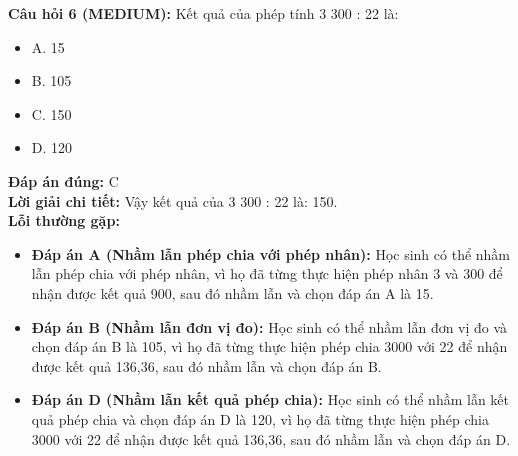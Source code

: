 \documentclass{article}
\begin{document}
\begin{minipage}{\textwidth}
\noindent\textbf{Câu hỏi 6 (MEDIUM):} Kết quả của phép tính 3 300 : 22 là: 
\begin{itemize}[label={}]
    \item A. 15
    \item B. 105
    \item C. 150
    \item D. 120
\end{itemize}
\textbf{Đáp án đúng:} C \\
\textbf{Lời giải chi tiết:} Vậy kết quả của 3 300 : 22 là: 150. \\
\textbf{Lỗi thường gặp:}
\begin{itemize}
  \item \textbf{Đáp án A (Nhầm lẫn phép chia với phép nhân):} Học sinh có thể nhầm lẫn phép chia với phép nhân, vì họ đã từng thực hiện phép nhân 3 và 300 để nhận được kết quả 900, sau đó nhầm lẫn và chọn đáp án A là 15.
  \item \textbf{Đáp án B (Nhầm lẫn đơn vị đo):} Học sinh có thể nhầm lẫn đơn vị đo và chọn đáp án B là 105, vì họ đã từng thực hiện phép chia 3000 với 22 để nhận được kết quả 136,36, sau đó nhầm lẫn và chọn đáp án B.
  \item \textbf{Đáp án D (Nhầm lẫn kết quả phép chia):} Học sinh có thể nhầm lẫn kết quả phép chia và chọn đáp án D là 120, vì họ đã từng thực hiện phép chia 3000 với 22 để nhận được kết quả 136,36, sau đó nhầm lẫn và chọn đáp án D.
\end{itemize}
\end{minipage}
\vspace{1em}
\end{document}
